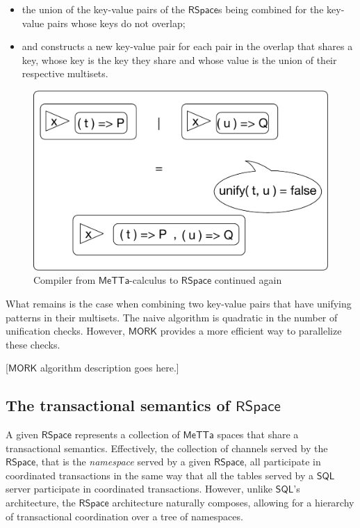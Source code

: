 \begin{itemize}
  \item the union of the key-value pairs of the $\mathsf{RSpace}$s
    being combined for the key-value pairs whose keys do not overlap;
  \item and constructs a new key-value pair for each pair in the
    overlap that shares a key, whose key is the key they share and
    whose value is the union of their respective multisets.
\end{itemize}

\begin{figure}
  \centering
  \includegraphics[scale=0.5]{MeTTaCalcImpl3.pdf}
  \caption{Compiler from $\mathsf{MeTTa}$-calculus to $\mathsf{RSpace}$ continued again}
\end{figure}

What remains is the case when combining two key-value pairs that have
unifying patterns in their multisets. The naive algorithm is quadratic
in the number of unification checks. However, $\mathsf{MORK}$ provides
a more efficient way to parallelize these checks.

[$\mathsf{MORK}$ algorithm description goes here.]

\subsection{The transactional semantics of $\mathsf{RSpace}$}

A given $\mathsf{RSpace}$ represents a collection of $\mathsf{MeTTa}$
spaces that share a transactional semantics. Effectively, the
collection of channels served by the $\mathsf{RSpace}$, that is the
\emph{namespace} served by a given $\mathsf{RSpace}$, all participate
in coordinated transactions in the same way that all the tables served
by a $\mathsf{SQL}$ server participate in coordinated
transactions. However, unlike $\mathsf{SQL}$'s architecture, the
$\mathsf{RSpace}$ architecture naturally composes, allowing for a
hierarchy of transactional coordination over a tree of namespaces.
